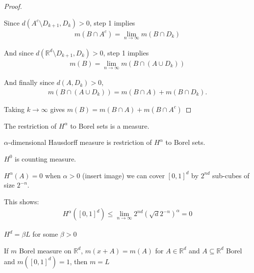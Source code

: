 \begin{proof}
\begin{enumerate}
			Since $d(A^{c} \setminus D_{k+1} , D_k) > 0$, step 1 implies
			 \begin{align*}
				m(B \cap A^{c}) = \lim_{n \to \infty} m(B \cap D_k)
			\end{align*}

			And since $d(\mathbb{R}^d \setminus D_{k+1}, D_k ) > 0$, step 1 implies
			\begin{align*}
				m(B ) = \lim_{n \to \infty} m(B \cap (A \cup D_{k}))
			\end{align*}

			And finally since $d(A, D_{k}) > 0$,
			\begin{align*}
				m(B \cap (A \cup D_{k})) = m(B \cap A) + m(B \cap D_{k}).
			\end{align*}
	\end{enumerate}

	Taking $k \to \infty$ gives $m(B) = m(B \cap A) + m(B \cap A^{c})$
\end{proof}


\begin{theorem}
	The restriction of $H^{\alpha}$ to Borel sets is a measure.
\end{theorem}


\begin{definition}
	$\alpha$-dimensional Hausdorff measure is restriction of $H^{\alpha}$ to Borel sets.
\end{definition}


\begin{example}
	$H^{0}$ is counting measure.
\end{example}


\begin{example}
	$H^{\alpha} (A) = 0$ when $\alpha > 0$
	(insert image) we can cover  $[0,1]^{d}$ by $2^{nd}$ sub-cubes of size $2^{-n}$.

	This shows:
	\begin{align*}
		H^{\alpha} ([0,1]^d) \leq \lim_{n \to \infty} 2^{nd}( \sqrt{d} 2^{-n})^{\alpha} = 0
	\end{align*}
\end{example}

\begin{example}
	$H^{d} = \beta L$ for some $\beta > 0$
\end{example}

\begin{theorem}
	If $m$ Borel measure on $\mathbb{R}^{d}$, $m(x + A) = m(A)$ for $A \in \mathbb{R}^d$ and $A \subseteq \mathbb{R}^d$ Borel and $m([0,1]^{d}) =1$, then $m = L$
\end{theorem}

